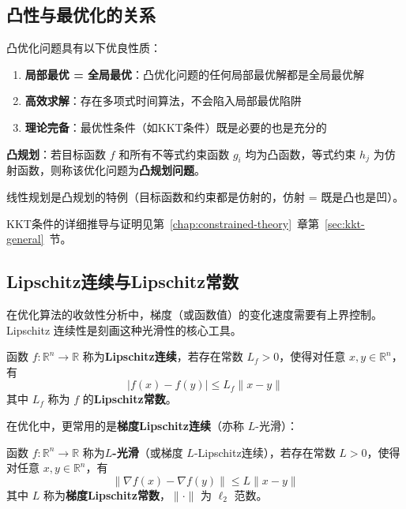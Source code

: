 \subsection{凸性与最优化的关系}

\begin{conceptbox}[为什么凸性如此重要]
凸优化问题具有以下优良性质：
\begin{enumerate}[label=(\arabic*), itemsep=0.3em]
    \item \textbf{局部最优 = 全局最优}：凸优化问题的任何局部最优解都是全局最优解
    \item \textbf{高效求解}：存在多项式时间算法，不会陷入局部最优陷阱
    \item \textbf{理论完备}：最优性条件（如KKT条件）既是必要的也是充分的
\end{enumerate}

\textbf{凸规划}：若目标函数 $f$ 和所有不等式约束函数 $g_i$ 均为凸函数，等式约束 $h_j$ 为仿射函数，则称该优化问题为\textbf{凸规划问题}。

线性规划是凸规划的特例（目标函数和约束都是仿射的，仿射 = 既是凸也是凹）。

KKT条件的详细推导与证明见第~\ref{chap:constrained-theory}~章第~\ref{sec:kkt-general}~节。
\end{conceptbox}

\subsection{Lipschitz连续与Lipschitz常数}\label{sec:lipschitz}

在优化算法的收敛性分析中，梯度（或函数值）的变化速度需要有上界控制。Lipschitz 连续性是刻画这种光滑性的核心工具。

\begin{definition}[Lipschitz连续]
函数 $f: \mathbb{R}^n \to \mathbb{R}$ 称为\textbf{Lipschitz连续}，若存在常数 $L_f > 0$，使得对任意 $x, y \in \mathbb{R}^n$，有
\[
|f(x) - f(y)| \leq L_f \|x - y\|
\]
其中 $L_f$ 称为 $f$ 的\textbf{Lipschitz常数}。
\end{definition}

在优化中，更常用的是\textbf{梯度Lipschitz连续}（亦称 $L$-光滑）：

\begin{definition}[$L$-光滑（梯度Lipschitz连续）]\label{def:L-smooth}
函数 $f: \mathbb{R}^n \to \mathbb{R}$ 称为\textbf{$L$-光滑}（或梯度 $L$-Lipschitz连续），若存在常数 $L > 0$，使得对任意 $x, y \in \mathbb{R}^n$，有
\[
\|\nabla f(x) - \nabla f(y)\| \leq L \|x - y\|
\]
其中 $L$ 称为\textbf{梯度Lipschitz常数}，$\|\cdot\|$ 为 $\ell_2$ 范数。
\end{definition}


